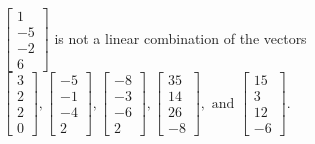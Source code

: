 \begin{exercise}
\begin{exerciseStatement}
  \end{exerciseStatement}
  \begin{exerciseAnswer}
   \(\left[\begin{array}{c}
1 \\
-5 \\
-2 \\
6
\end{array}\right]\) 
  	 is not  
	a linear combination of the vectors \(\left[\begin{array}{c}
3 \\
2 \\
2 \\
0
\end{array}\right] , \left[\begin{array}{c}
-5 \\
-1 \\
-4 \\
2
\end{array}\right] , \left[\begin{array}{c}
-8 \\
-3 \\
-6 \\
2
\end{array}\right] , \left[\begin{array}{c}
35 \\
14 \\
26 \\
-8
\end{array}\right] , \text{ and } \left[\begin{array}{c}
15 \\
3 \\
12 \\
-6
\end{array}\right]\).

	
  


  \end{exerciseAnswer}
\end{exercise}